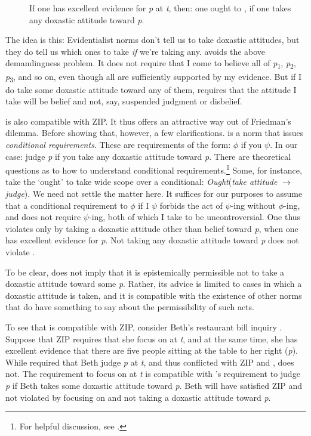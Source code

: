 \documentclass[12pt]{article}
\begin{document}
\begin{description}
    \item[\eoc] If one has excellent evidence for \textit{p} at \textit{t}, then: one ought to \jud{}, if one takes any doxastic attitude toward \textit{p}.
\end{description}
%
The idea is this: Evidentialist norms don't tell us to take doxastic attitudes, but they do tell us which ones to take \textit{if} we're taking any. \eoc{} avoids the above demandingness problem. It does not require that I come to believe all of \textit{p}\textsubscript{1}, \textit{p}\textsubscript{2}, \textit{p}\textsubscript{3}, and so on, even though all are sufficiently supported by my evidence. But if I do take some doxastic attitude toward any of them, \eoc{} requires that the attitude I take will be belief and not, say, suspended judgment or disbelief.

\eoc{} is also compatible with ZIP. It thus offers an attractive way out of Friedman's dilemma. Before showing that, however, a few clarifications. \eoc{} is a norm that issues \textit{conditional requirements}. These are requirements of the form: $\phi$ if you $\psi$. In our case: judge \textit{p} if you take any doxastic attitude toward \textit{p}. There are theoretical questions as to how to understand conditional requirements.\footnote{For helpful discussion, see \textcite[ch.~3]{kiesewetter_normativity_2017}.} Some, for instance, take the `ought' to take wide scope over a conditional: \textit{Ought}(\textit{take attitude} $\rightarrow$ \textit{judge}). We need not settle the matter here. It suffices for our purposes to assume that a conditional requirement to $\phi$ if I $\psi$ forbids the act of $\psi$-ing without $\phi$-ing, and does not require $\psi$-ing, both of which I take to be uncontroversial. One thus violates \eoc{} only by taking a doxastic attitude other than belief toward \textit{p}, when one has excellent evidence for \textit{p}. Not taking any doxastic attitude toward \textit{p} does not violate \eoc{}.

To be clear, \eoc{} does not imply that it is epistemically permissible not to take a doxastic attitude toward some \textit{p}. Rather, its advice is limited to cases in which a doxastic attitude is taken, and it is compatible with the existence of other norms that do have something to say about the permissibility of such acts.

To see that \eoc{} is compatible with ZIP, consider Beth's restaurant bill inquiry . Suppose that ZIP requires that she focus on  at \textit{t}, and at the same time, she has excellent evidence that there are five people sitting at the table to her right (\textit{p}). While \eo{} required that Beth judge \textit{p} at \textit{t}, and thus conflicted with ZIP and \opic{}, \eoc{} does not. The requirement to focus on  at \textit{t} is compatible with \eoc{}'s requirement to judge \textit{p} if Beth takes some doxastic attitude toward \textit{p}. Beth will have satisfied ZIP and not violated \eoc{} by focusing on  and not taking a doxastic attitude toward \textit{p}.
\end{document}

